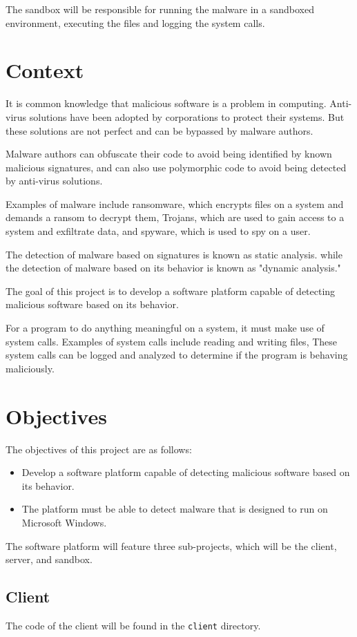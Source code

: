 The sandbox will be responsible for running the malware in a sandboxed environment,
executing the files and logging the system calls.

\section{Context}
It is common knowledge that malicious software is a problem in computing.
Anti-virus solutions have been adopted by corporations to protect their systems.
But these solutions are not perfect and can be bypassed by malware authors.

Malware authors can obfuscate their code to avoid being identified by known malicious signatures,
and can also use polymorphic code to avoid being detected by anti-virus solutions.

Examples of malware include ransomware, which encrypts files on a system and demands a ransom to decrypt them,
Trojans, which are used to gain access to a system and exfiltrate data,
and spyware, which is used to spy on a user.

The detection of malware based on signatures is known as static analysis.
while the detection of malware based on its behavior is known as "dynamic analysis."

The goal of this project is to develop a software platform capable of detecting malicious software based on its behavior.

For a program to do anything meaningful on a system, it must make use of system calls.
Examples of system calls include reading and writing files,
These system calls can be logged and analyzed to determine if the program is behaving maliciously.

\section{Objectives}
The objectives of this project are as follows:
\begin{itemize}
    \item Develop a software platform capable of detecting malicious software based on its behavior.
    \item The platform must be able to detect malware that is designed to run on Microsoft Windows.
\end{itemize}

The software platform will feature three sub-projects, which will be the client, server, and sandbox.

\subsection{Client}
The code of the client will be found in the \texttt{client} directory.

